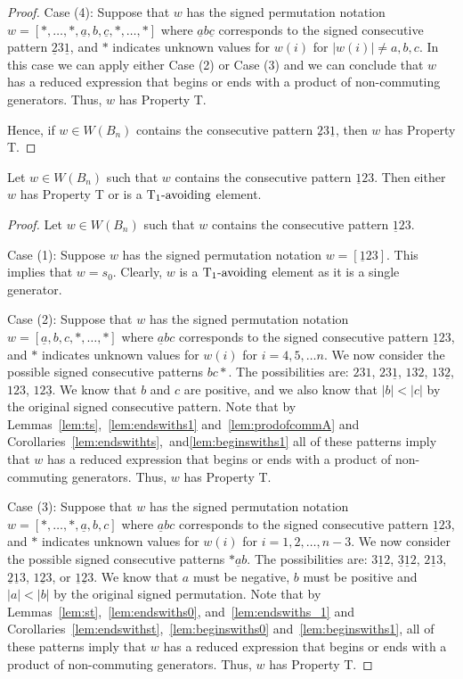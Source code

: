 \begin{lemma}
\begin{proof}
	Case (4): Suppose that $w$ has the signed permutation notation $w=[\ast, \ldots,\ast, \underline{a},b,\underline{c}, \ast, \ldots, \ast]$ where $\underline{a}b\underline{c}$ corresponds to the signed consecutive pattern $\underline{2}3\underline{1}$, and $\ast$ indicates unknown values for $w(i)$ for $|w(i)|\neq a,b,c$. In this case we can apply either Case (2) or Case (3) and we can conclude that $w$ has a reduced expression that begins or ends with a product of non-commuting generators. Thus, $w$ has Property T.

	Hence, if $w \in W(B_n)$ contains the consecutive pattern $\underline{2}3\underline{1}$, then $w$ has Property T.
\end{proof}	
\end{lemma}

\begin{lemma}\label{lem:123}
Let $w \in W(B_n)$ such that $w$ contains the consecutive pattern $\underline{1}23$. Then either $w$ has Property T or is a $\operatorname{T_1-\mathrm{avoiding}}$ element.
\begin{proof}
	Let $w \in W(B_n)$ such that $w$ contains the consecutive pattern $\underline{1}23$.
	
	Case (1): Suppose $w$ has the signed permutation notation $w=[\underline{1}23]$. This implies that $w=s_0$. Clearly, $w$ is a $\operatorname{T_1-\mathrm{avoiding}}$ element as it is a single generator.
	
	Case (2): Suppose that $w$ has the signed permutation notation $w=[\underline{a},b,c, \ast, \ldots, \ast]$ where $\underline{a}bc$ corresponds to the signed consecutive pattern $\underline{1}23$, and $\ast$ indicates unknown values for $w(i)$ for $i=4,5, \ldots n$. We now consider the possible signed consecutive patterns $bc \ast$. The possibilities are: $231$, $23 \underline{1}$, $132$, $13 \underline{2}$, $123$, $12 \underline{3}$. We know that $b$ and $c$ are positive, and we also know that $|b|<|c|$ by the original signed consecutive pattern. Note that by Lemmas~\ref{lem:ts},~\ref{lem:endswiths1} and~\ref{lem:prodofcommA} and Corollaries~\ref{lem:endswithts},~and\ref{lem:beginswiths1} all of these patterns imply that $w$ has a reduced expression that begins or ends with a product of non-commuting generators. Thus, $w$ has Property T.
	
	Case (3): Suppose that $w$ has the signed permutation notation $w=[\ast, \ldots, \ast, \underline{a},b,c]$ where $\underline{a}bc$ corresponds to the signed consecutive pattern $\underline{1}23$, and $\ast$ indicates unknown values for $w(i)$ for $i=1,2, \ldots ,n-3$. We now consider the possible signed consecutive patterns $\ast \underline{a} b$. The possibilities are: $3 \underline{1} 2$, $\underline{3} \underline{1} 2$, $2 \underline{1} 3$, $\underline{2} \underline{1} 3$, $1 \underline{2} 3$, or $\underline{1} \underline{2} 3$. We know that $a$ must be negative, $b$ must be positive and $|a|<|b|$ by the original signed permutation. Note that by Lemmas~\ref{lem:st},~\ref{lem:endswiths0}, and~\ref{lem:endswiths_1} and Corollaries~\ref{lem:endswithst},~\ref{lem:beginswiths0} and~\ref{lem:beginswiths1}, all of these patterns imply that $w$ has a reduced expression that begins or ends with a product of non-commuting generators. Thus, $w$ has Property T. 
	

\end{proof}
\end{lemma}
